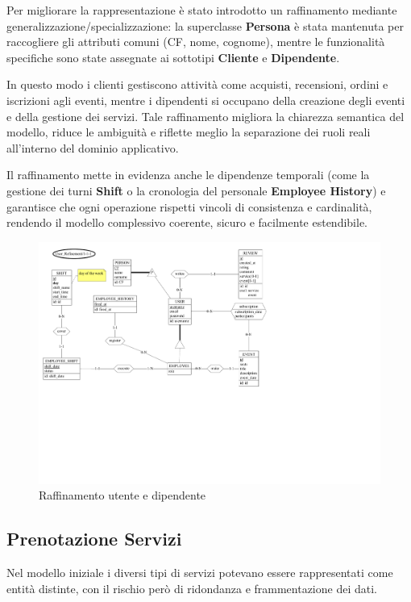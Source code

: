 \documentclass[a4paper,12pt]{report}
\begin{document}
\vspace{\baselineskip}
Per migliorare la rappresentazione è stato introdotto un raffinamento mediante
generalizzazione/specializzazione: la superclasse \textbf{Persona} è
stata mantenuta per
raccogliere gli attributi comuni (CF, nome, cognome), mentre le
funzionalità specifiche sono
state assegnate ai sottotipi \textbf{Cliente} e \textbf{Dipendente}.

\vspace{\baselineskip}
In questo modo i clienti gestiscono attività come acquisti,
recensioni, ordini e iscrizioni agli
eventi, mentre i dipendenti si occupano della creazione degli eventi
e della gestione dei
servizi. Tale raffinamento migliora la chiarezza semantica del
modello, riduce le ambiguità e
riflette meglio la separazione dei ruoli reali all'interno del
dominio applicativo.

\vspace{\baselineskip}
Il raffinamento mette in evidenza anche le dipendenze temporali (come
  la gestione dei turni \textbf{Shift} o la cronologia del personale
\textbf{Employee History}) e garantisce che ogni operazione rispetti
vincoli di consistenza e cardinalità, rendendo il modello complessivo
coerente, sicuro e facilmente estendibile.

\begin{figure}[H]
  \centering
  \includegraphics[width=\textwidth, trim=0 200pt 275pt 0,
  clip]{./schemas/refinements/user.pdf}
  \caption{Raffinamento utente e dipendente}
  \label{fig:raffinamento-utente}
\end{figure}

\newpage
\subsection{Prenotazione Servizi}
Nel modello iniziale i diversi tipi di servizi potevano essere
rappresentati come entità
distinte, con il rischio però di ridondanza e frammentazione dei dati.
\end{document}
